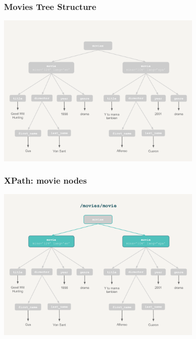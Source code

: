 \documentclass{beamer}\usepackage[]{graphicx}\usepackage[]{color}
\begin{document}
\begin{frame}[fragile]
\frametitle{Movies Tree Structure}

\begin{center}
\includegraphics[width=10cm]{images/xpath_tree.pdf}
\end{center}

\end{frame}


\begin{frame}[fragile]
\frametitle{XPath: movie nodes}

\begin{center}
\includegraphics[width=10cm]{images/xpath_movie.pdf}
\end{center}

\end{frame}

\end{document}
